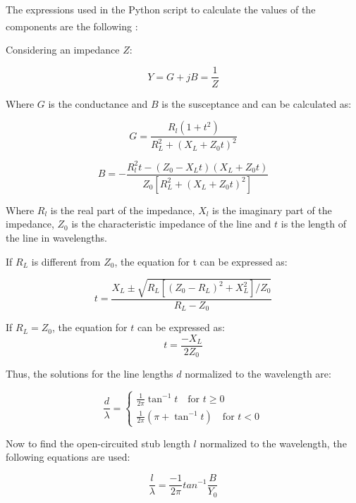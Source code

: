 The expressions used in the Python script to calculate the values of the components are the following \textsuperscript{\cite{Pozar}}:

Considering an impedance $Z$:

\begin{equation}
    Y = G + jB = \frac{1}{Z}
\end{equation}

Where $G$ is the conductance and $B$ is the susceptance and can be calculated as:

\begin{equation}
    G = \frac{R_l(1+t^2)}{R_L^2 + (X_L +Z_0t)^2}
\end{equation}

\begin{equation}
    B = -\frac{R_l^2t-(Z_0-X_Lt)(X_L+Z_0t)}{Z_0[R_L^2 + (X_L +Z_0t)^2]}
\end{equation}

Where $R_l$ is the real part of the impedance, $X_l$ is the imaginary part of the impedance, $Z_0$ is the characteristic impedance of the line and $t$ is the length of the line in wavelengths.

If $R_L$ is different from $Z_0$, the equation for t can be expressed as:

\begin{equation}
    t = \frac{X_L \pm \sqrt{R_L[(Z_0-R_L)^2+X_L^2]/Z_0}}{R_L-Z_0}
\end{equation}

If $R_L = Z_0$, the equation for $t$ can be expressed as:
\begin{equation}
    t = \frac{-X_L}{2Z_0}
\end{equation}

Thus, the solutions for the line lengths $d$ normalized to the wavelength are:

\begin{equation}
    \frac{d}{\lambda} =
    \begin{cases}
        \frac{1}{2\pi}\tan^{-1} t \quad \text{for } t \geq 0 \\
        \frac{1}{2\pi}\left(\pi + \tan^{-1} t\right) \quad \text{for } t < 0
    \end{cases}
    \label{eq:dlength}
\end{equation}

Now to find the open-circuited stub length $l$ normalized to the wavelength, the following equations are used:

\begin{equation}
    \frac{l}{\lambda} = \frac{-1}{2\pi}tan^{-1}\frac{B}{Y_0}
    \label{eq:llength}
\end{equation}

